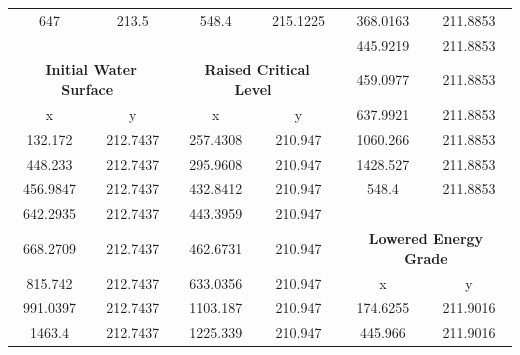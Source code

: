 \begin{center}
\begin{tabular}{|cc|cc|cc|}
        647      & 213.5                                         & 548.4    & 215.1225                                  & 368.0163 & 211.8853                                          \\
                 &                                               &          &                                           & 445.9219 & 211.8853                                          \\
        \multicolumn{2}{|c|}{\textbf{Initial Water Surface~ }}   & \multicolumn{2}{c|}{\textbf{Raised Critical Level~ }}      & 459.0977 & 211.8853                                          \\ 
        \cline{1-4}
        x        & y                                             & x        & y                                         & 637.9921 & 211.8853                                          \\
        132.172  & 212.7437                                      & 257.4308 & 210.947                                   & 1060.266 & 211.8853                                          \\
        448.233  & 212.7437                                      & 295.9608 & 210.947                                   & 1428.527 & 211.8853                                          \\
        456.9847 & 212.7437                                      & 432.8412 & 210.947                                   & 548.4    & 211.8853                                          \\
        642.2935 & 212.7437                                      & 443.3959 & 210.947                                   &          &                                                   \\
        668.2709 & 212.7437                                      & 462.6731 & 210.947                                   & \multicolumn{2}{c|}{\textbf{Lowered Energy Grade }}          \\ 
        \cline{5-6}
        815.742  & 212.7437                                      & 633.0356 & 210.947                                   & x        & y                                                 \\
        991.0397 & 212.7437                                      & 1103.187 & 210.947                                   & 174.6255 & 211.9016                                          \\
        1463.4   & 212.7437                                      & 1225.339 & 210.947                                   & 445.966  & 211.9016                                          \\

\end{tabular}
\end{center}
